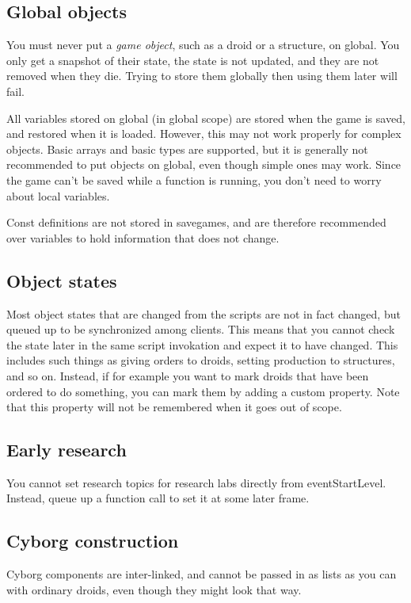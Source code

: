 \documentclass[12pt]{article}
\begin{document}
\subsection{Global objects}
You must never put a \emph{game object}, such as a droid or a structure, on global. You only get a snapshot of their state,
the state is not updated, and they are not removed when they die. Trying to store them globally then using them 
later will fail.

All variables stored on global (in global scope) are stored when the game is saved, and restored when it is 
loaded. However, this may not work properly for complex objects. Basic arrays and basic types are supported,
but it is generally not recommended to put objects on global, even though simple ones may work. Since the game
can't be saved while a function is running, you don't need to worry about local variables.

Const definitions are not stored in savegames, and are therefore recommended over variables to hold information 
that does not change.

\subsection{Object states}
Most object states that are changed from the scripts are not in fact changed, but queued up to be synchronized
among clients. This means that you cannot check the state later in the same script invokation and expect it to
have changed. This includes such things as giving orders to droids, setting production to structures, and so on.
Instead, if for example you want to mark droids that have been ordered to do something, you can mark them by 
adding a custom property. Note that this property will not be remembered when it goes out of scope.

\subsection{Early research}
You cannot set research topics for research labs directly from eventStartLevel. Instead, queue up a function
call to set it at some later frame.

\subsection{Cyborg construction}
Cyborg components are inter-linked, and cannot be passed in as lists as you can with ordinary droids, even
though they might look that way.


\end{document}
